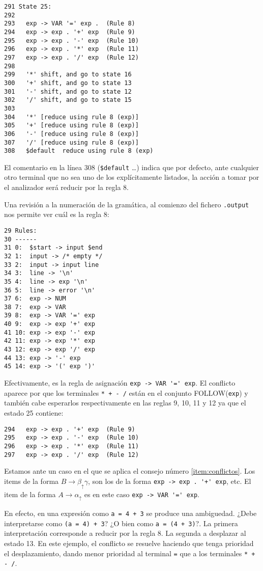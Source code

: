 \begin{example}
\begin{verbatim}
291 State 25:
292
293   exp -> VAR '=' exp .  (Rule 8)
294   exp -> exp . '+' exp  (Rule 9)
295   exp -> exp . '-' exp  (Rule 10)
296   exp -> exp . '*' exp  (Rule 11)
297   exp -> exp . '/' exp  (Rule 12)
298
299   '*' shift, and go to state 16
300   '+' shift, and go to state 13
301   '-' shift, and go to state 12
302   '/' shift, and go to state 15
303
304   '*' [reduce using rule 8 (exp)]
305   '+' [reduce using rule 8 (exp)]
306   '-' [reduce using rule 8 (exp)]
307   '/' [reduce using rule 8 (exp)]
308   $default  reduce using rule 8 (exp)
\end{verbatim}
El comentario en la línea 308 (\verb|$default| \ldots )
indica que por defecto, ante cualquier
otro terminal que no sea uno de los explícitamente listados, 
la acción a tomar por el analizador será reducir por la regla 8.

Una revisión a la numeración de la gramática, al comienzo
del fichero \verb|.output| nos permite ver cuál
es la regla 8:
\begin{verbatim}
29 Rules:
30 ------
31 0:  $start -> input $end
32 1:  input -> /* empty */
33 2:  input -> input line
34 3:  line -> '\n'
35 4:  line -> exp '\n'
36 5:  line -> error '\n'
37 6:  exp -> NUM
38 7:  exp -> VAR
39 8:  exp -> VAR '=' exp
40 9:  exp -> exp '+' exp
41 10: exp -> exp '-' exp
42 11: exp -> exp '*' exp
43 12: exp -> exp '/' exp
44 13: exp -> '-' exp
45 14: exp -> '(' exp ')'
\end{verbatim}
Efectivamente, es la regla de asignación \verb|exp -> VAR '=' exp|.
El conflicto aparece por que los terminales 
\verb|* + - /| están en el conjunto FOLLOW(\verb|exp|)
y también cabe esperarlos respectivamente 
en las reglas 9, 10, 11 y 12 ya que el estado 
25 contiene:

\begin{verbatim}
294   exp -> exp . '+' exp  (Rule 9)
295   exp -> exp . '-' exp  (Rule 10)
296   exp -> exp . '*' exp  (Rule 11)
297   exp -> exp . '/' exp  (Rule 12)
\end{verbatim}

Estamos ante un caso en el que se aplica el consejo número
\ref{item:conflictos}.
Los items de la forma
$B \rightarrow \beta_\uparrow \gamma$, son los
de la forma \verb|exp -> exp . '+' exp|, etc.
El item de la forma $A \rightarrow \alpha_\uparrow$ 
es en este caso \verb|exp -> VAR '=' exp|.

En efecto, en una expresión como \verb|a = 4 + 3| se produce
una ambiguedad. ¿Debe interpretarse como \verb|(a = 4) + 3|?
¿O bien como \verb|a = (4 + 3)|?. La primera interpretación
corresponde a reducir por la regla 8. La segunda a desplazar al
estado 13.  En este ejemplo, el conflicto
se resuelve haciendo que tenga prioridad el desplazamiento,
dando menor prioridad al terminal \verb|=| que a los 
terminales \verb|* + - /|.
\end{example}

